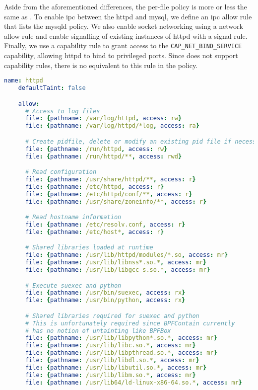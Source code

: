 Aside from the aforementioned differences, the per-file policy is more or less the same as
\bpfbox{}.  To enable \gls{ipc} between the httpd and mysql, we define an \gls{ipc} allow
rule that lists the mysqld policy. We also enable socket networking using a network allow
rule and enable signalling of existing instances of httpd with a signal rule. Finally,
we use a capability rule to grant access to the \texttt{CAP\_NET\_BIND\_SERVICE} capability,
allowing httpd to bind to privileged ports. Since \bpfbox{} does not support capability rules,
there is no equivalent to this rule in the \bpfbox{} policy.

\begin{lstlisting}[language=yaml, gobble=4, float=false, caption={[A \bpfcontain{} policy for Apache httpd]
  A \bpfcontain{} policy for Apache httpd.
  %\todo{Describe this}
}, label={lst:bpfcontain-apache}]
    name: httpd
    defaultTaint: false

    allow:
      # Access to log files
      file: {pathname: /var/log/httpd, access: rw}
      file: {pathname: /var/log/httpd/*log, access: ra}

      # Create pidfile, delete or modify an existing pid file if necessary
      file: {pathname: /run/httpd, access: rw}
      file: {pathname: /run/httpd/**, access: rwd}

      # Read configuration
      file: {pathname: /usr/share/httpd/**, access: r}
      file: {pathname: /etc/httpd, access: r}
      file: {pathname: /etc/httpd/conf/**, access: r}
      file: {pathname: /usr/share/zoneinfo/**, access: r}

      # Read hostname information
      file: {pathname: /etc/resolv.conf, access: r}
      file: {pathname: /etc/host*, access: r}

      # Shared libraries loaded at runtime
      file: {pathname: /usr/lib/httpd/modules/*.so, access: mr}
      file: {pathname: /usr/lib/libnss*.so.*, access: mr}
      file: {pathname: /usr/lib/libgcc_s.so.*, access: mr}

      # Execute suexec and python
      file: {pathname: /usr/bin/suexec, access: rx}
      file: {pathname: /usr/bin/python, access: rx}

      # Shared libraries required for suexec and python
      # This is unfortunately required since BPFContain currently
      # has no notion of untainting like BPFBox
      file: {pathname: /usr/lib/libpython*.so.*, access: mr}
      file: {pathname: /usr/lib/libc.so.*, access: mr}
      file: {pathname: /usr/lib/libpthread.so.*, access: mr}
      file: {pathname: /usr/lib/libdl.so.*, access: mr}
      file: {pathname: /usr/lib/libutil.so.*, access: mr}
      file: {pathname: /usr/lib/libm.so.*, access: mr}
      file: {pathname: /usr/lib64/ld-linux-x86-64.so.*, access: mr}


\end{lstlisting}
